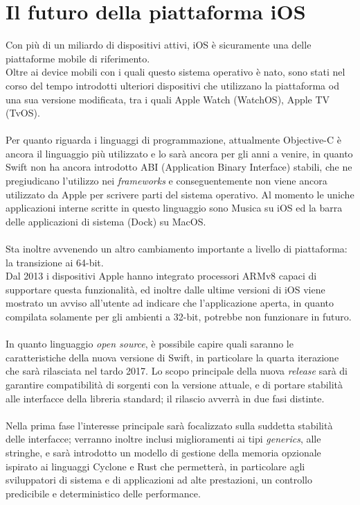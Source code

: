 \chapter{Il futuro della piattaforma iOS}
Con più di un miliardo di dispositivi attivi, iOS è sicuramente una delle piattaforme mobile di riferimento.\\
Oltre ai device mobili con i quali questo sistema operativo è nato, sono stati nel corso del tempo introdotti ulteriori dispositivi che utilizzano la piattaforma od una sua versione modificata, tra i quali Apple Watch (WatchOS), Apple TV (TvOS).\\\\Per quanto riguarda i linguaggi di programmazione, attualmente Objective-C è ancora il linguaggio più utilizzato e lo sarà ancora per gli anni a venire, in quanto Swift non ha ancora introdotto ABI (Application Binary Interface) stabili, che ne pregiudicano l'utilizzo nei \textit{frameworks} e conseguentemente non viene ancora utilizzato da Apple per scrivere parti del sistema operativo. Al momento le uniche applicazioni interne scritte in questo linguaggio sono Musica su iOS ed la barra delle applicazioni di sistema (Dock) su MacOS.\\\\
Sta inoltre avvenendo un altro cambiamento importante a livello di piattaforma: la transizione ai 64-bit.\\Dal 2013 i dispositivi Apple hanno integrato processori ARMv8 capaci di supportare questa funzionalità, ed inoltre dalle ultime versioni di iOS viene mostrato un avviso all'utente ad indicare che l'applicazione aperta, in quanto compilata solamente per gli ambienti a 32-bit, potrebbe non funzionare in futuro.\\\\
In quanto linguaggio \textit{open source}, è possibile capire quali saranno le caratteristiche della nuova versione di Swift, in particolare la quarta iterazione che sarà rilasciata nel tardo 2017.\newpage
Lo scopo principale della nuova \textit{release} sarà di garantire compatibilità di sorgenti con la versione attuale, e di portare stabilità alle interfacce della libreria standard; il rilascio avverrà in due fasi distinte.\\\\
Nella prima fase l'interesse principale sarà focalizzato sulla suddetta stabilità delle interfacce; verranno inoltre inclusi miglioramenti ai tipi \textit{generics}, alle stringhe, e sarà introdotto un modello di gestione della memoria opzionale ispirato ai linguaggi Cyclone e Rust che permetterà, in particolare agli sviluppatori di sistema e di applicazioni ad alte prestazioni, un controllo predicibile e deterministico delle performance.\\\\
